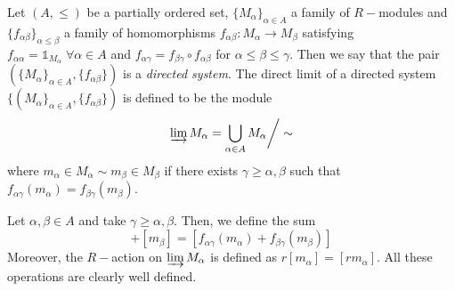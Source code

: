 \begin{dang}
    \begin{definition}
    Let $(A, \leq)$ be a partially ordered set, $\{M_\alpha\}_{\alpha\in A}$ a family of $R-$modules 
    and $\{f_{\alpha\beta}\}_{\alpha\leq\beta}$ a family of homomorphisms $f_{\alpha\beta}:M_\alpha\rightarrow M_\beta$ 
    satisfying $f_{\alpha\alpha}=\mathds{1}_{M_\alpha}\;\forall\alpha\in A$ 
    and $f_{\alpha\gamma}=f_{\beta\gamma}\circ f_{\alpha\beta}$ for $\alpha\leq\beta\leq\gamma$. 
    Then we say that the pair $(\{M_{\alpha}\}_{\alpha\in A},\{f_{\alpha\beta}\})$ 
    is a \textit{directed system}. The direct limit of a directed system 
    $\{(M_{\alpha}\}_{\alpha\in A},\{f_{\alpha\beta}\})$ is defined to be the module
    \begin{equation}
        \varinjlim M_\alpha = \bigcup_{\alpha\in A}M_\alpha\bigg/\sim
    \end{equation}
    where $m_\alpha\in M_\alpha\sim m_\beta\in M_\beta$ if there exists $\gamma\geq \alpha,\beta$ such that $f_{\alpha\gamma}(m_\alpha)=f_{\beta\gamma}(m_\beta)$. 
    \end{definition}
\end{dang}
Let $\alpha,\beta \in A$ and take $\gamma\geq\alpha,\beta$. Then, we define the sum
\begin{equation}
    [m_\alpha]+[m_\beta]=[f_{\alpha\gamma}(m_\alpha)+f_{\beta\gamma}(m_\beta)]
\end{equation}
Moreover, the $R-$action on $\varinjlim M_\alpha$ is defined as $r[m_\alpha]=[rm_\alpha]$. All these operations are 
clearly well defined.

